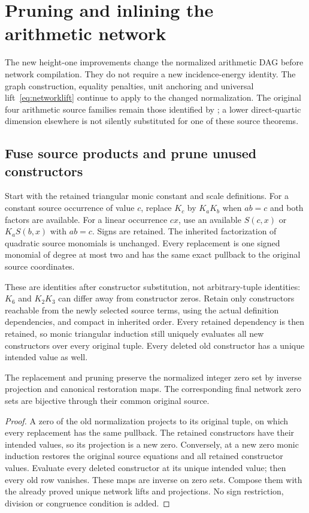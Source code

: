 \section{Pruning and inlining the arithmetic network}
\label{sec:height23}
The new height-one improvements change the normalized arithmetic DAG before
network compilation. They do not require a new incidence-energy identity.
The graph construction, equality penalties, unit anchoring and universal
lift~\eqref{eq:networklift} continue to apply to the changed normalization.
The original four arithmetic source families remain those identified by
; a lower direct-quartic dimension
elsewhere is not silently substituted for one of these source theorems.

\subsection{Fuse source products and prune unused constructors}
Start with the retained triangular monic constant and scale definitions.
For a constant source occurrence of value $c$, replace $K_c$ by $K_aK_b$
when $ab=c$ and both factors are available. For a linear occurrence $cx$,
use an available $S(c,x)$ or $K_aS(b,x)$ with $ab=c$. Signs are retained.
The inherited factorization of quadratic source monomials is unchanged.
Every replacement is one signed monomial of degree at most two and has the
same exact pullback to the original source coordinates.

These are identities after constructor substitution, not arbitrary-tuple
identities: $K_6$ and $K_2K_3$ can differ away from constructor zeros.
Retain only constructors reachable from the newly selected source terms,
using the actual definition dependencies, and compact in inherited order.
Every retained dependency is then retained, so monic triangular induction
still uniquely evaluates all new constructors over every original tuple.
Every deleted old constructor has a unique intended value as well.

\begin{proposition}\label{prop:network-prune}
The replacement and pruning preserve the normalized integer zero set by
inverse projection and canonical restoration maps. The corresponding final
network zero sets are bijective through their common original source.
\end{proposition}
\begin{proof}
A zero of the old normalization projects to its original tuple, on which
every replacement has the same pullback. The retained constructors have
their intended values, so its projection is a new zero. Conversely, at a
new zero monic induction restores the original source equations and all
retained constructor values. Evaluate every deleted constructor at its
unique intended value; then every old row vanishes. These maps are inverse
on zero sets. Compose them with the already proved unique network lifts and
projections. No sign restriction, division or congruence condition is added.
\end{proof}

